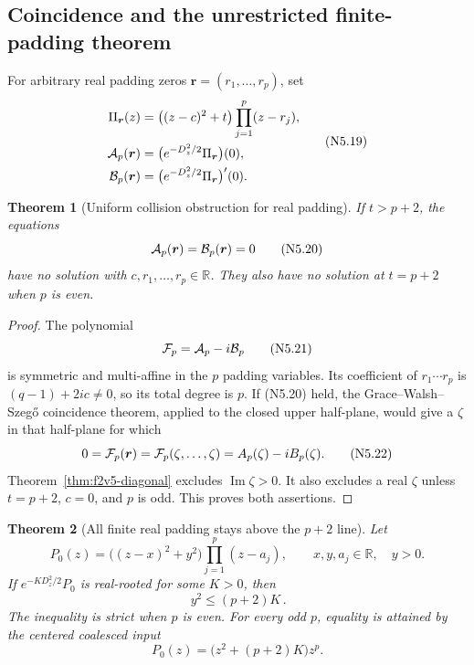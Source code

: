 \documentclass[11pt]{article}
\newtheorem{theorem}{Theorem}[section]
\theoremstyle{definition}
\theoremstyle{remark}
\begin{document}
\subsection{Coincidence and the unrestricted finite-padding theorem}

For arbitrary real padding zeros \(\boldsymbol r=(r_1,\ldots,r_p)\), set
\[
\begin{aligned}
 \Pi_{\boldsymbol r}(z)
 &=\bigl((z-c)^2+t\bigr)\prod_{j=1}^p(z-r_j),\\
 {\cal A}_p(\boldsymbol r)
 &=\bigl(e^{-D_z^2/2}\Pi_{\boldsymbol r}\bigr)(0),\\
 {\cal B}_p(\boldsymbol r)
 &=\bigl(e^{-D_z^2/2}\Pi_{\boldsymbol r}\bigr)'(0).
\end{aligned}
\tag{N5.19}
\]

\begin{theorem}[Uniform collision obstruction for real padding]
\label{thm:f2v5-collision}
If \(t>p+2\), the equations
\[
 {\cal A}_p(\boldsymbol r)={\cal B}_p(\boldsymbol r)=0
 \tag{N5.20}
\]
have no solution with \(c,r_1,\ldots,r_p\in\mathbb R\).  They also have
no solution at \(t=p+2\) when \(p\) is even.
\end{theorem}

\begin{proof}
The polynomial
\[
 {\cal F}_p={\cal A}_p-i{\cal B}_p
 \tag{N5.21}
\]
is symmetric and multi-affine in the \(p\) padding variables.  Its
coefficient of \(r_1\cdots r_p\) is
\((q-1)+2ic\ne0\), so its total degree is \(p\).  If
\textup{(N5.20)} held, the Grace--Walsh--Szeg\H{o} coincidence theorem,
applied to the closed upper half-plane, would give a
\(\zeta\) in that half-plane for which
\[
 0={\cal F}_p(\boldsymbol r)
 ={\cal F}_p(\zeta,\ldots,\zeta)
 =A_p(\zeta)-iB_p(\zeta).
 \tag{N5.22}
\]
Theorem~\ref{thm:f2v5-diagonal} excludes \(\operatorname{Im}\zeta>0\).
It also excludes a real \(\zeta\) unless \(t=p+2\), \(c=0\), and \(p\)
is odd.  This proves both assertions.
\end{proof}

\begin{theorem}[All finite real padding stays above the \(p+2\) line]
\label{thm:f2v5-global}
Let
\[
 P_0(z)=\bigl((z-x)^2+y^2\bigr)\prod_{j=1}^p(z-a_j),
 \qquad x,y,a_j\in\mathbb R,\quad y>0.
 \tag{N5.23}
\]
If \(e^{-KD_z^2/2}P_0\) is real-rooted for some \(K>0\), then
\[
 \boxed{\,y^2\le(p+2)K\,}.
 \tag{N5.24}
\]
The inequality is strict when \(p\) is even.  For every odd \(p\), equality
is attained by the centered coalesced input
\[
 P_0(z)=\bigl(z^2+(p+2)K\bigr)z^p.
 \tag{N5.25}
\]
\end{theorem}
\end{document}
